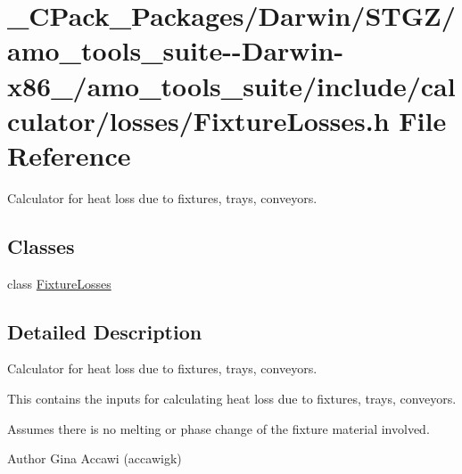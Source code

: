 \hypertarget{___c_pack___packages_2_darwin_2_s_t_g_z_2amo__tools__suite--_darwin-x86__64_2amo__tools__suite_213ce320545ff913138db2e645210ad8a}{}\section{\+\_\+\+C\+Pack\+\_\+\+Packages/\+Darwin/\+S\+T\+G\+Z/amo\+\_\+tools\+\_\+suite-\/-\/\+Darwin-\/x86\+\_/amo\+\_\+tools\+\_\+suite/include/calculator/losses/\+Fixture\+Losses.h File Reference}
\label{___c_pack___packages_2_darwin_2_s_t_g_z_2amo__tools__suite--_darwin-x86__64_2amo__tools__suite_213ce320545ff913138db2e645210ad8a}


Calculator for heat loss due to fixtures, trays, conveyors.  


\subsection*{Classes}
\begin{DoxyCompactItemize}
\item 
class \hyperlink{class_fixture_losses}{Fixture\+Losses}
\end{DoxyCompactItemize}


\subsection{Detailed Description}
Calculator for heat loss due to fixtures, trays, conveyors. 

This contains the inputs for calculating heat loss due to fixtures, trays, conveyors.

Assumes there is no melting or phase change of the fixture material involved.

\begin{DoxyAuthor}{Author}
Gina Accawi (accawigk) 
\end{DoxyAuthor}
